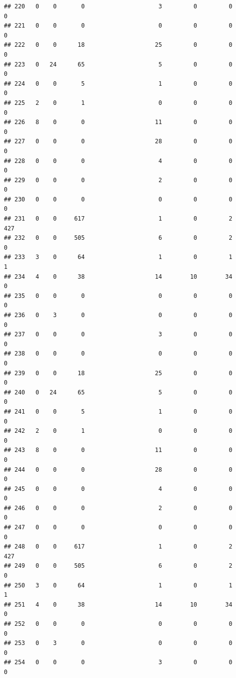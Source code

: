 \documentclass[
]{article}
\begin{document}
\begin{verbatim}
## 220   0    0       0                     3         0         0        0
## 221   0    0       0                     0         0         0        0
## 222   0    0      18                    25         0         0        0
## 223   0   24      65                     5         0         0        0
## 224   0    0       5                     1         0         0        0
## 225   2    0       1                     0         0         0        0
## 226   8    0       0                    11         0         0        0
## 227   0    0       0                    28         0         0        0
## 228   0    0       0                     4         0         0        0
## 229   0    0       0                     2         0         0        0
## 230   0    0       0                     0         0         0        0
## 231   0    0     617                     1         0         2      427
## 232   0    0     505                     6         0         2        0
## 233   3    0      64                     1         0         1        1
## 234   4    0      38                    14        10        34        0
## 235   0    0       0                     0         0         0        0
## 236   0    3       0                     0         0         0        0
## 237   0    0       0                     3         0         0        0
## 238   0    0       0                     0         0         0        0
## 239   0    0      18                    25         0         0        0
## 240   0   24      65                     5         0         0        0
## 241   0    0       5                     1         0         0        0
## 242   2    0       1                     0         0         0        0
## 243   8    0       0                    11         0         0        0
## 244   0    0       0                    28         0         0        0
## 245   0    0       0                     4         0         0        0
## 246   0    0       0                     2         0         0        0
## 247   0    0       0                     0         0         0        0
## 248   0    0     617                     1         0         2      427
## 249   0    0     505                     6         0         2        0
## 250   3    0      64                     1         0         1        1
## 251   4    0      38                    14        10        34        0
## 252   0    0       0                     0         0         0        0
## 253   0    3       0                     0         0         0        0
## 254   0    0       0                     3         0         0        0

\end{verbatim}
\end{document}
